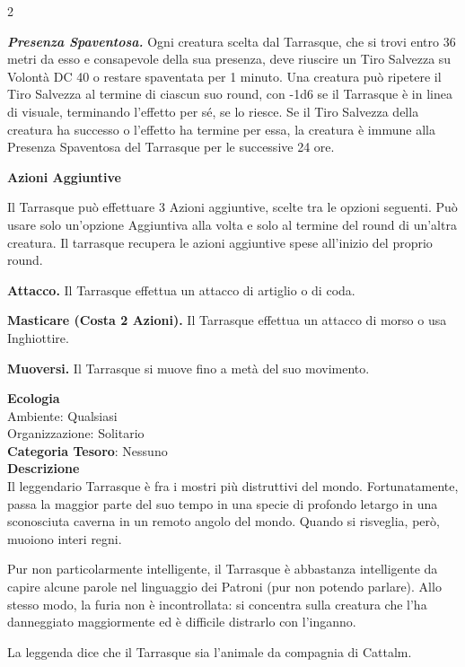 \begin{multicols}{2}
{\emph{\textbf{Presenza Spaventosa.}} Ogni creatura scelta dal Tarrasque, che si trovi entro 36 metri da esso e consapevole della sua presenza, deve riuscire un Tiro Salvezza su Volontà DC 40 o restare spaventata per 1 minuto. Una creatura può ripetere il Tiro Salvezza al termine di ciascun suo round, con -1d6 se il Tarrasque è in linea di visuale, terminando l'effetto per sé, se lo riesce. Se il Tiro Salvezza della creatura ha successo o l'effetto ha termine per essa, la creatura è immune alla Presenza Spaventosa del Tarrasque per le successive 24 ore.

\textbf{Azioni Aggiuntive}

Il Tarrasque può effettuare 3 Azioni aggiuntive, scelte tra le opzioni seguenti. Può usare solo un'opzione Aggiuntiva alla volta e solo al termine del round di un'altra creatura. Il tarrasque recupera le azioni aggiuntive spese all'inizio del proprio round.

\textbf{Attacco.} Il Tarrasque effettua un attacco di artiglio o di coda.

\textbf{Masticare (Costa 2 Azioni).} Il Tarrasque effettua un attacco di morso o usa Inghiottire.

\textbf{Muoversi.} Il Tarrasque si muove fino a metà del suo movimento.

\textbf{Ecologia}\\
Ambiente: Qualsiasi\\
Organizzazione: Solitario\\
\textbf{Categoria Tesoro}: Nessuno\\
\textbf{Descrizione}\\
Il leggendario Tarrasque è fra i mostri più distruttivi del mondo. Fortunatamente, passa la maggior parte del suo tempo in una specie di profondo letargo in una sconosciuta caverna in un remoto angolo del mondo. Quando si risveglia, però, muoiono interi regni.

Pur non particolarmente intelligente, il Tarrasque è abbastanza intelligente da capire alcune parole nel linguaggio dei Patroni (pur non potendo parlare). Allo stesso modo, la furia non è incontrollata: si concentra sulla creatura che l'ha danneggiato maggiormente ed è difficile distrarlo con l'inganno.

La leggenda dice che il Tarrasque sia l'animale da compagnia di Cattalm.

}
\end{multicols}
